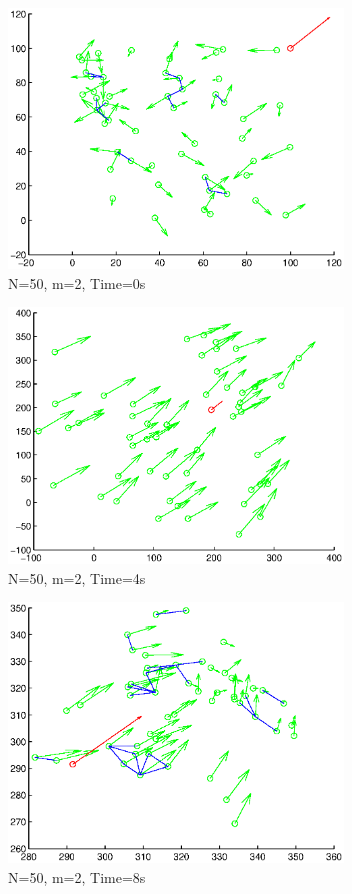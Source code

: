 \documentclass[10pt, conference, compsocconf]{IEEEtran}
\begin{document}
\begin{figure}[!p]
  \begin{center}
    \includegraphics[width=3.5in]{n50m2t00}
  \end{center}

  \caption{\small N=50, m=2, Time=0s}
  \label{fig:n50m2t00}
\end{figure}

\begin{figure}[!p]
  \begin{center}
    \includegraphics[width=3.5in]{n50m2t04}
  \end{center}

  \caption{\small N=50, m=2, Time=4s}
  \label{fig:n50m2t04}
\end{figure}

\begin{figure}[!p]
  \begin{center}
    \includegraphics[width=3.5in]{n50m2t08}
  \end{center}

  \caption{\small N=50, m=2, Time=8s}
  \label{fig:n50m2t08}
\end{figure}
\end{document}
